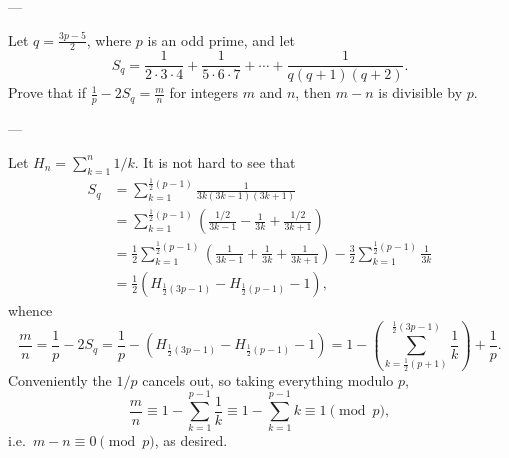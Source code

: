 
---

Let $q=\frac{3p-5}2$, where $p$ is an odd prime, and let \[S_q=\frac1{2\cdot3\cdot4}+\frac1{5\cdot6\cdot7}+\cdots+\frac1{q(q+1)(q+2)}.\]
Prove that if $\frac1p-2S_q=\frac mn$ for integers $m$ and $n$, then $m-n$ is divisible by $p$.

---

Let $H_n=\sum_{k=1}^n1/k$. It is not hard to see that
\begin{align*}
    S_q&=\sum_{k=1}^{\frac12(p-1)}\frac1{3k(3k-1)(3k+1)}\\
        &=\sum_{k=1}^{\frac12(p-1)}\left(\frac{1/2}{3k-1}-\frac1{3k}+\frac{1/2}{3k+1}\right)\\
        &=\frac12\sum_{k=1}^{\frac12(p-1)}\left(\frac1{3k-1}+\frac1{3k}+\frac1{3k+1}\right)-\frac32\sum_{k=1}^{\frac12(p-1)}\frac1{3k}\\
        &=\frac12\left(H_{\frac12(3p-1)}-H_{\frac12(p-1)}-1\right),
\end{align*}
whence \[\frac mn=\frac1p-2S_q=\frac1p-\left(H_{\frac12(3p-1)}-H_{\frac12(p-1)}-1\right)=1-\left(\sum_{k=\frac12(p+1)}^{\frac12(3p-1)}\frac1k\right)+\frac1p.\]
Conveniently the $1/p$ cancels out, so taking everything modulo $p$, \[\frac mn\equiv 1-\sum_{k=1}^{p-1}\frac1k\equiv 1-\sum_{k=1}^{p-1}k\equiv 1\pmod p,\]
i.e.\ $m-n\equiv 0\pmod p$, as desired.
